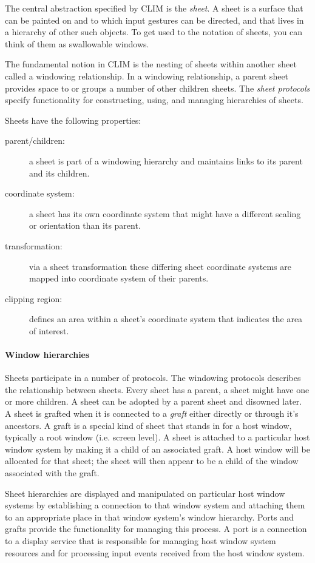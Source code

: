 \documentclass[twocolumn,a4paper]{article}
\newcommand {\concept} [1] {{\sl #1}\index{#1}}
\newcommand {\CLIM}{{\small CLIM}}
\begin{document}
The central abstraction specified by \CLIM{} is the \concept{sheet}. A sheet is a surface that can be painted on and to which input gestures can be directed, and that lives in a hierarchy of other such objects. To get used to the notation of sheets, you can think of them as swallowable windows. 

The fundamental notion in \CLIM{} is the nesting of sheets within another sheet called a windowing relationship. In a windowing relationship, a parent sheet provides space to or groups a number of other children sheets. The \concept{sheet protocols} specify functionality for constructing, using, and managing hierarchies of sheets.

Sheets have the following properties:
\begin{description}
\item[parent/children:] a sheet is part of a windowing hierarchy and maintains links to its parent and its children. 
\item[coordinate system:] a sheet has its own coordinate system that might have a different scaling or orientation than its parent.
\item[transformation:] via a sheet transformation these differing sheet coordinate systems are mapped into coordinate system of their parents.
\item[clipping region:] defines an area within a sheet's coordinate system that indicates the area of interest.
\end{description}

\paragraph*{Window hierarchies} Sheets participate in a number of protocols. The windowing protocols describes the relationship between sheets. Every sheet has a parent, a sheet might have one or more children. A sheet can be adopted by a parent sheet and disowned later. A sheet is grafted when it is connected to a \concept{graft} either directly or through it's ancestors. A graft is a special kind of sheet that stands in for a host window, typically a root window (i.e. screen level). A sheet is attached to a particular host window system by making it a child of an associated graft. A host window will be allocated for that sheet; the sheet will then appear to be a child of the window associated with the graft.

Sheet hierarchies are displayed and manipulated on particular host window systems by establishing a connection to that window system and attaching them to an appropriate place in that window system's window hierarchy. Ports and grafts provide the functionality for managing this process. A port is a connection to a display service that is responsible for managing host window system resources and for processing input events received from the host window system.
\end{document}
